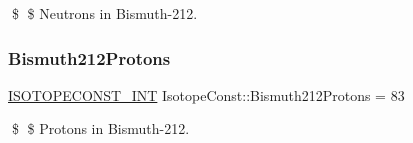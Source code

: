 \$ \$ Neutrons in Bismuth-\/212. \mbox{\label{group___isotope_const-_bismuth-_bi212_ga0f0a9d02760d8ba0804adef866d7d270}} 
\subsubsection{\texorpdfstring{Bismuth212\+Protons}{Bismuth212Protons}}
{\footnotesize\ttfamily \mbox{\hyperlink{group___isotope_const-_macros_ga5f18360b3e99483a35c32d789e62621c}{I\+S\+O\+T\+O\+P\+E\+C\+O\+N\+S\+T\+\_\+\+I\+NT}} Isotope\+Const\+::\+Bismuth212\+Protons = 83}

\$ \$ Protons in Bismuth-\/212. 